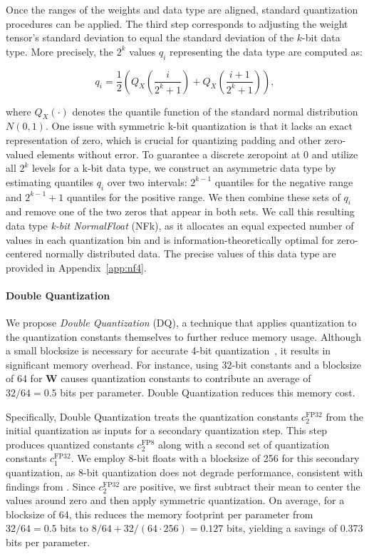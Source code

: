 Once the ranges of the weights and data type are aligned, standard quantization procedures can be applied. The third step corresponds to adjusting the weight tensor's standard deviation to equal the standard deviation of the $k$-bit data type. More precisely, the $2^k$ values $q_i$ representing the data type are computed as:

\begin{equation}
q_i  = \frac{1}{2}\left( Q_X\left(\frac{i}{2^k+1}\right) + Q_X\left(\frac{i+1}{2^k+1}\right)\right),
\end{equation}

where $Q_X(\cdot)$ denotes the quantile function of the standard normal distribution $N(0,1)$. One issue with symmetric k-bit quantization is that it lacks an exact representation of zero, which is crucial for quantizing padding and other zero-valued elements without error. To guarantee a discrete zeropoint at $0$ and utilize all $2^k$ levels for a k-bit data type, we construct an asymmetric data type by estimating quantiles $q_i$ over two intervals: $2^{k-1}$ quantiles for the negative range and $2^{k-1}+1$ quantiles for the positive range. We then combine these sets of $q_i$ and remove one of the two zeros that appear in both sets. We call this resulting data type \emph{k-bit NormalFloat} (NFk), as it allocates an equal expected number of values in each quantization bin and is information-theoretically optimal for zero-centered normally distributed data. The precise values of this data type are provided in Appendix~\ref{app:nf4}.

\paragraph{Double Quantization{}} 
We propose \emph{Double Quantization} (DQ), a technique that applies quantization to the quantization constants themselves to further reduce memory usage. Although a small blocksize is necessary for accurate 4-bit quantization~\citep{dettmers2022case}, it results in significant memory overhead. For instance, using 32-bit constants and a blocksize of 64 for $\mathbf{W}$ causes quantization constants to contribute an average of $32/64 = 0.5$ bits per parameter. Double Quantization reduces this memory cost.

Specifically, Double Quantization treats the quantization constants $c_2^{\text{FP32}}$ from the initial quantization as inputs for a secondary quantization step. This step produces quantized constants $c_2^{\text{FP8}}$ along with a second set of quantization constants $c_1^{\text{FP32}}$. We employ 8-bit floats with a blocksize of 256 for this secondary quantization, as 8-bit quantization does not degrade performance, consistent with findings from \citet{dettmers2022case}. Since $c_2^{\text{FP32}}$ are positive, we first subtract their mean to center the values around zero and then apply symmetric quantization. On average, for a blocksize of 64, this reduces the memory footprint per parameter from $32/64=0.5$ bits to $8/64 + 32/(64 \cdot 256) = 0.127$ bits, yielding a savings of 0.373 bits per parameter.


